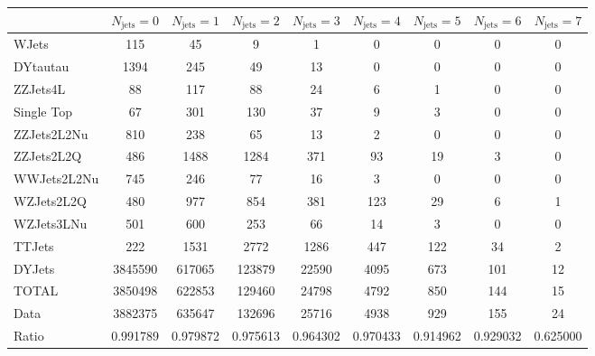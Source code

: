 \footnotesize{
\begin{tabular}{l|cccccccc} 
  &  $N_{\text{jets}} = 0 $ & $N_{\text{jets}} = 1 $ & $N_{\text{jets}} = 2 $ & $N_{\text{jets}} = 3 $ & $N_{\text{jets}} = 4 $ & $N_{\text{jets}} = 5 $ & $N_{\text{jets}} = 6 $ & $N_{\text{jets}} = 7$ \\ \hline 
   WJets        & 115 & 45 & 9 & 1 & 0 & 0 & 0 & 0 \\ 
   DYtautau        & 1394 & 245 & 49 & 13 & 0 & 0 & 0 & 0 \\ 
   ZZJets4L        & 88 & 117 & 88 & 24 & 6 & 1 & 0 & 0 \\ 
   Single Top        & 67 & 301 & 130 & 37 & 9 & 3 & 0 & 0 \\ 
   ZZJets2L2Nu        & 810 & 238 & 65 & 13 & 2 & 0 & 0 & 0 \\ 
   ZZJets2L2Q        & 486 & 1488 & 1284 & 371 & 93 & 19 & 3 & 0 \\ 
   WWJets2L2Nu        & 745 & 246 & 77 & 16 & 3 & 0 & 0 & 0 \\ 
   WZJets2L2Q        & 480 & 977 & 854 & 381 & 123 & 29 & 6 & 1 \\ 
   WZJets3LNu        & 501 & 600 & 253 & 66 & 14 & 3 & 0 & 0 \\ 
   TTJets        & 222 & 1531 & 2772 & 1286 & 447 & 122 & 34 & 2 \\ 
   DYJets        & 3845590 & 617065 & 123879 & 22590 & 4095 & 673 & 101 & 12 \\ 
 \hline 
 TOTAL & 3850498 & 622853 & 129460 & 24798 & 4792 & 850 & 144 & 15 \\ 
 \hline 
 Data          & 3882375 & 635647 & 132696 & 25716 & 4938 & 929 & 155 & 24 \\ 
  Ratio          & 0.991789 & 0.979872 & 0.975613 & 0.964302 & 0.970433 & 0.914962 & 0.929032 & 0.625000 \\ 
 \end{tabular}}
